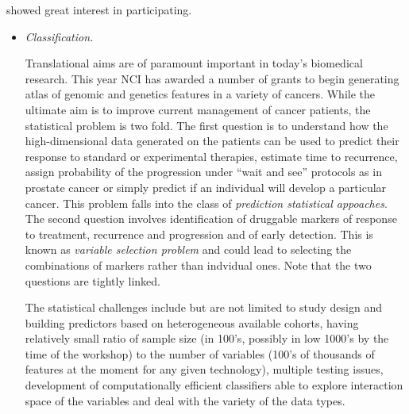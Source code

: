 \documentclass[12pt]{amsart}
\begin{document}
showed great interest in participating.



\begin{itemize}




\item \textit{Classification.}

Translational aims are of paramount important in today's biomedical research. This year NCI has awarded a number of grants to begin generating atlas of genomic and genetics features in a variety of cancers. While the ultimate aim is to improve current management of cancer patients, the statistical problem is two fold. The first question is to understand how the high-dimensional data generated on the patients can be used to predict their response to standard or experimental therapies, estimate time to recurrence, assign probability of the progression under ``wait and see'' protocols as in prostate cancer or simply predict if an individual will develop a particular cancer. This problem falls into the class of {\em prediction statistical appoaches}. The second question involves identification of druggable markers of response to treatment, recurrence and progression and of early detection. This is known as {\em variable selection problem} and could lead to selecting the combinations of markers rather than indvidual ones. Note that the two questions are tightly linked. 

The statistical challenges include but are not limited to  study design and building predictors based on heterogeneous available cohorts, having relatively small ratio of sample size (in 100's, possibly in low 1000's by the time of the workshop) to the number of variables (100's of thousands of features at the moment for any given technology), multiple testing issues, development of computationally efficient classifiers able to explore interaction space of the variables and deal with the variety of the data types.



\end{itemize}
\end{document}
